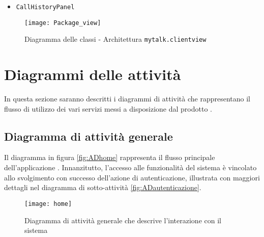 \begin{itemize}[leftmargin=0em]
\item \texttt{CallHistoryPanel}

\end{itemize}

\begin{figure}[H]
\begin{center}
\texttt{[image: Package\_view]}
\caption{Diagramma delle classi - Architettura \texttt{mytalk.clientview}}\label{fig:package_client_presenterview}
\end{center}
\end{figure}
\clearpage

\section{Diagrammi delle attività}
In questa sezione saranno descritti i diagrammi di attività che rappresentano il flusso di utilizzo dei vari servizi messi a disposizione dal prodotto \caName.

\subsection{Diagramma di attività generale}

Il diagramma in figura \vref{fig:ADhome} rappresenta il flusso principale dell'applicazione \caName. Innanzitutto, l'accesso alle funzionalità del sistema è vincolato allo svolgimento con successo dell'azione di autenticazione, illustrata con maggiori dettagli nel diagramma di sotto-attività \vref{fig:ADautenticazione}.

\begin{figure}[H]
\centering
\texttt{[image: home]}
\caption{Diagramma di attività generale che descrive l'interazione con il sistema}\label{fig:ADhome}
\end{figure}

